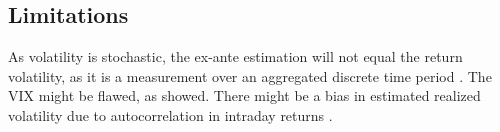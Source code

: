 \subsection{Limitations}\label{sec:43Limits}
As volatility is stochastic, the ex-ante estimation will not equal the return volatility, as it is a measurement over an aggregated discrete time period \parencite{andersen2001}.
The VIX might be flawed, as \textcite{jiang2007} showed.
There might be a bias in estimated realized volatility due to autocorrelation in intraday returns \parencite{jiang2003}. 

